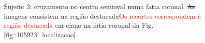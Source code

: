  \begin{figure}[H]
\centering
    \hfill
    \caption{Sujeito 3: cruzamento no centro semioval numa fatia coronal. \sout{As imagens consistem na região destacada}\textcolor{red}{Os recortes correspondem à região destacada} em ciano na fatia coronal da Fig. \ref{fig::105923_localizacao}.
    }
    \label{fig::105923_crossing}
\end{figure}

